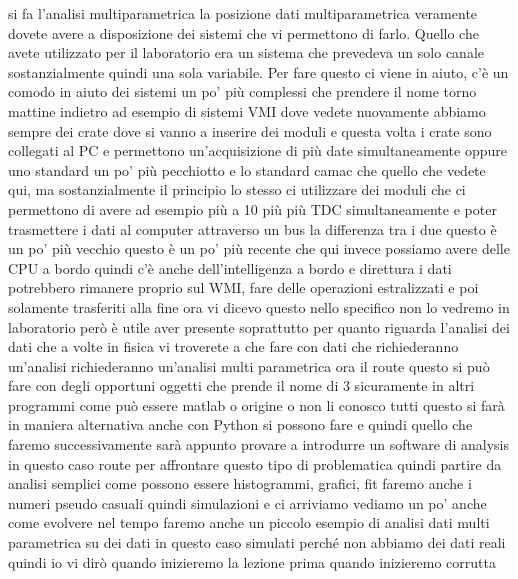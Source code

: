 {si fa l'analisi multiparametrica la posizione dati multiparametrica veramente dovete avere a disposizione dei sistemi che vi permettono di farlo. Quello che avete utilizzato per il laboratorio era un sistema che prevedeva un solo canale sostanzialmente quindi una sola variabile. Per fare questo ci viene in aiuto, c'è un comodo in aiuto dei sistemi un po' più complessi che prendere il nome torno mattine indietro ad esempio di sistemi VMI dove vedete nuovamente abbiamo sempre dei crate dove si vanno a inserire dei moduli e questa volta i crate sono collegati al PC e permettono un'acquisizione di più date simultaneamente oppure uno standard un po' più pecchiotto e lo standard camac che quello che vedete qui, ma sostanzialmente il principio lo stesso ci utilizzare dei moduli che ci permettono di avere ad esempio più a 10 più più TDC simultaneamente e poter trasmettere i dati al computer attraverso un bus la differenza tra i due questo è un po' più vecchio questo è un po' più recente che qui invece possiamo avere delle CPU a bordo quindi c'è anche dell'intelligenza a bordo e direttura i dati potrebbero rimanere proprio sul WMI, fare delle operazioni estralizzati e poi solamente trasferiti alla fine ora vi dicevo questo nello specifico non lo vedremo in laboratorio però è utile aver presente soprattutto per quanto riguarda l'analisi dei dati che a volte in fisica vi troverete a che fare con dati che richiederanno un'analisi richiederanno un'analisi multi parametrica ora il route questo si può fare con degli opportuni oggetti che prende il nome di 3 sicuramente in altri programmi come può essere matlab o origine o non li conosco tutti questo si farà in maniera alternativa anche con Python si possono fare e quindi quello che faremo successivamente sarà appunto provare a introdurre un software di analysis in questo caso route per affrontare questo tipo di problematica quindi partire da analisi semplici come possono essere histogrammi, grafici, fit faremo anche i numeri pseudo casuali quindi simulazioni e ci arriviamo vediamo un po' anche come evolvere nel tempo faremo anche un piccolo esempio di analisi dati multi parametrica su dei dati in questo caso simulati perché non abbiamo dei dati reali quindi io vi dirò quando inizieremo la lezione prima quando inizieremo corrutta
}